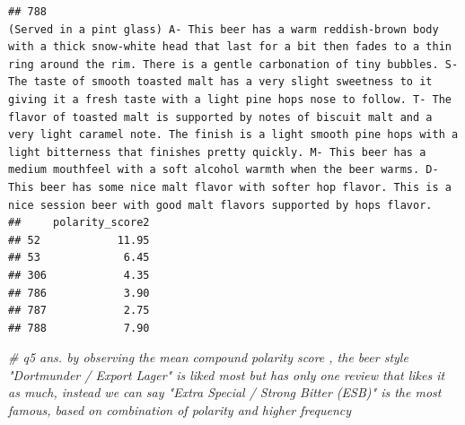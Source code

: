 \documentclass[
  a4paper,
]{article}
\newenvironment{Shaded}{\begin{snugshade}}{\end{snugshade}}
\newcommand{\CommentTok}[1]{\textcolor[rgb]{0.56,0.35,0.01}{\textit{#1}}}
\begin{document}
\begin{verbatim}
## 788                                                                                                                                                                                                                                                                                                                                                                                                                                                                                                                                                                                                                                                                                                                                                                                                                                                                                                                                                                                                    (Served in a pint glass) A- This beer has a warm reddish-brown body with a thick snow-white head that last for a bit then fades to a thin ring around the rim. There is a gentle carbonation of tiny bubbles. S- The taste of smooth toasted malt has a very slight sweetness to it giving it a fresh taste with a light pine hops nose to follow. T- The flavor of toasted malt is supported by notes of biscuit malt and a very light caramel note. The finish is a light smooth pine hops with a light bitterness that finishes pretty quickly. M- This beer has a medium mouthfeel with a soft alcohol warmth when the beer warms. D- This beer has some nice malt flavor with softer hop flavor. This is a nice session beer with good malt flavors supported by hops flavor.
##     polarity_score2
## 52            11.95
## 53             6.45
## 306            4.35
## 786            3.90
## 787            2.75
## 788            7.90
\end{verbatim}

\begin{Shaded}
\begin{Highlighting}[]
\CommentTok{\# q5 ans. by observing the mean compound polarity score , the beer style "Dortmunder / Export Lager" is liked most but has only one review that likes it as much, instead we can say "Extra Special / Strong Bitter (ESB)" is the most famous, based on combination of polarity and higher frequency}
\end{Highlighting}
\end{Shaded}
\end{document}
